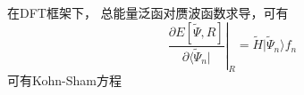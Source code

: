  
在\textrm{DFT}框架下，%
总能量泛函对赝波函数求导，可有
\begin{equation}
	\left.\dfrac{\partial E[\tilde\Psi, R]}{\partial\langle\tilde\Psi_n|}\right|_R=\tilde H|\tilde\Psi_n\rangle f_n
	\label{eq:PAW-Blochl-17}
\end{equation}
可有\textrm{Kohn-Sham}方程
